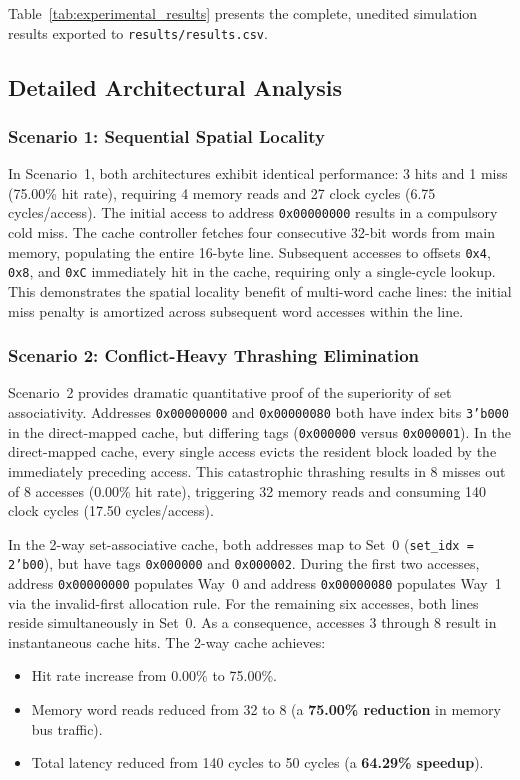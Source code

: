 \documentclass[conference]{IEEEtran}
\begin{document}
Table~\ref{tab:experimental_results} presents the complete, unedited simulation results exported to \texttt{results/results.csv}.

\subsection{Detailed Architectural Analysis}

\subsubsection{Scenario 1: Sequential Spatial Locality}
In Scenario~1, both architectures exhibit identical performance: 3 hits and 1 miss (75.00\% hit rate), requiring 4 memory reads and 27 clock cycles (6.75 cycles/access). The initial access to address \texttt{0x00000000} results in a compulsory cold miss. The cache controller fetches four consecutive 32-bit words from main memory, populating the entire 16-byte line. Subsequent accesses to offsets \texttt{0x4}, \texttt{0x8}, and \texttt{0xC} immediately hit in the cache, requiring only a single-cycle lookup. This demonstrates the spatial locality benefit of multi-word cache lines: the initial miss penalty is amortized across subsequent word accesses within the line.

\subsubsection{Scenario 2: Conflict-Heavy Thrashing Elimination}
Scenario~2 provides dramatic quantitative proof of the superiority of set associativity. Addresses \texttt{0x00000000} and \texttt{0x00000080} both have index bits \texttt{3'b000} in the direct-mapped cache, but differing tags (\texttt{0x000000} versus \texttt{0x000001}). In the direct-mapped cache, every single access evicts the resident block loaded by the immediately preceding access. This catastrophic thrashing results in 8 misses out of 8 accesses (0.00\% hit rate), triggering 32 memory reads and consuming 140 clock cycles (17.50 cycles/access).

In the 2-way set-associative cache, both addresses map to Set~0 (\texttt{set\_idx = 2'b00}), but have tags \texttt{0x000000} and \texttt{0x000002}. During the first two accesses, address \texttt{0x00000000} populates Way~0 and address \texttt{0x00000080} populates Way~1 via the invalid-first allocation rule. For the remaining six accesses, both lines reside simultaneously in Set~0. As a consequence, accesses 3 through 8 result in instantaneous cache hits. The 2-way cache achieves:
\begin{itemize}
    \item Hit rate increase from 0.00\% to 75.00\%.
    \item Memory word reads reduced from 32 to 8 (a \textbf{75.00\% reduction} in memory bus traffic).
    \item Total latency reduced from 140 cycles to 50 cycles (a \textbf{64.29\% speedup}).
\end{itemize}
\end{document}
